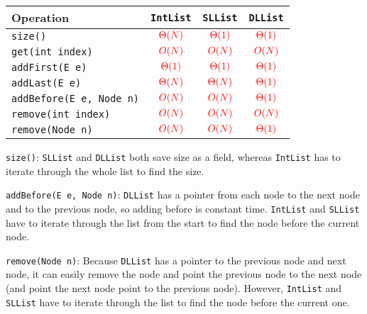 \begin{solution}
\renewcommand{\arraystretch}{2}
\setlength{\tabcolsep}{16pt}
\begin{tabularx}{\textwidth}{Xccc}
Operation                          & \lstinline$IntList$    & \lstinline$SLList$     & \lstinline$DLList$     \\ \hline
\lstinline$size()$                 & $\color{red}\Theta(N)$ & $\color{red}\Theta(1)$ & $\color{red}\Theta(1)$ \\
\lstinline$get(int index)$         & $\color{red}O(N)$      & $\color{red}O(N)$      & $\color{red}O(N)$      \\
\lstinline$addFirst(E e)$          & $\color{red}\Theta(1)$ & $\color{red}\Theta(1)$ & $\color{red}\Theta(1)$ \\
\lstinline$addLast(E e)$           & $\color{red}\Theta(N)$ & $\color{red}\Theta(N)$ & $\color{red}\Theta(1)$ \\
\lstinline$addBefore(E e, Node n)$ & $\color{red}O(N)$      & $\color{red}O(N)$      & $\color{red}\Theta(1)$ \\
\lstinline$remove(int index)$      & $\color{red}O(N)$      & $\color{red}O(N)$      & $\color{red}O(N)$      \\
\lstinline$remove(Node n)$         & $\color{red}O(N)$      & $\color{red}O(N)$      & $\color{red}\Theta(1)$ \\
\end{tabularx}

\lstinline$size()$: \lstinline$SLList$ and \lstinline$DLList$ both save size as
a field, whereas \lstinline$IntList$ has to iterate through the whole list to
find the size.

\lstinline$addBefore(E e, Node n)$: \lstinline$DLList$ has a pointer from each
node to the next node and to the previous node, so adding before is constant
time. \lstinline$IntList$ and \lstinline$SLList$ have to iterate through the
list from the start to find the node before the current node.

\lstinline$remove(Node n)$: Because \lstinline$DLList$ has a pointer to the
previous node and next node, it can easily remove the node and point the
previous node to the next node (and point the next node point to the previous
node). However, \lstinline$IntList$ and \lstinline$SLList$ have to iterate
through the list to find the node before the current one.
\end{solution}

